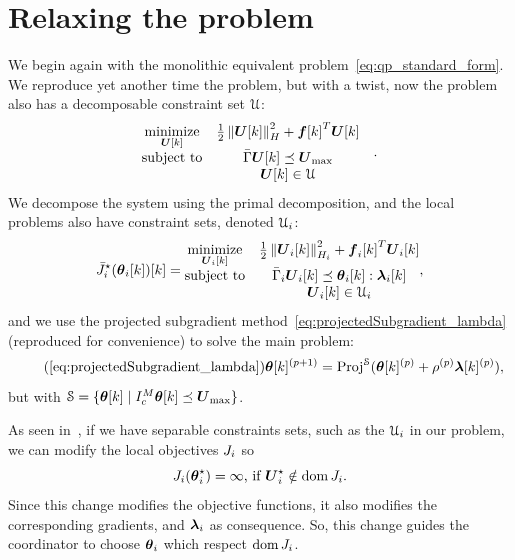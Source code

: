 \documentclass[../main.tex]{subfiles}
\begin{document}
\section{Relaxing the problem}\label{sec:not-so-deprived}
We begin again with the monolithic \mpc{} equivalent problem~\eqref{eq:qp_standard_form}.
We reproduce yet another time the problem, but with a twist, now the problem also has a decomposable constraint set $\mathcal{U}$:
\begin{equation}
  \label{eq:qp_standard_form_again_set_constraint}
  \begin{aligned}
    \begin{matrix}
      \mathop{\textrm{minimize}}\limits_{\boldsymbol{U}[k]} &
                                      \frac{1}{2}\left\lVert\boldsymbol{U}[k]\right\rVert^{2}_{H} + {\boldsymbol{f}[k]}^{T}\boldsymbol{U}[k] &\\
      \mathrm{subject~ to} & \bar{\Gamma}\boldsymbol{U}[k]\preceq {\boldsymbol{U}}_{\text{max}} \\
                                    & \boldsymbol{U}[k]\in \mathcal{U}
    \end{matrix}
  \end{aligned}.
\end{equation}
We decompose the system using the primal decomposition, and the local problems also have constraint sets, denoted $\mathcal{U}_{i}$:
\begin{equation}
  \label{eq:DOP_local_set_constraint}
  \eqoptobji(\thetaik)[k]=
  \begin{matrix}
    \minimize\limits_{\vec{U}_{i}[k]}&\frac{1}{2}\norm{\vec{U}_{i}[k]}^{2}_{H_{i}} + {\vec{f}_{i}[k]}^{T}\vec{U}_{i}[k]\\
    \mathrm{subject~ to} & \bar{\Gamma}_{i}\vec{U}_{i}[k] \preceq \thetaik:\lambdaik\\
                                     & \vec{U}_{i}[k]\in \set{U}_{i}
  \end{matrix},
\end{equation}
and we use the projected subgradient method~\eqref{eq:projectedSubgradient_lambda} (reproduced for convenience) to solve the main problem:
\begin{equation}
  \label{eq:projectedSubgradient_lambda_reprise}
  \tag{\ref*{eq:projectedSubgradient_lambda}}
  \vec{\theta}[k]\pplusone=\Proj^{\set{S}}(\vec{\theta}[k]\p+\rho\p\vec{\lambda}[k]\p),
\end{equation}
but with ${\mathcal{S} = \{\boldsymbol{\theta}[k]\mid I_{c}^{M}\boldsymbol{\theta}[k]\preceq \boldsymbol{U}_{\max}\}}$.
\begin{remark}
  As seen in~\cite{BoydEtAl2015}, if we have separable constraints sets, such as the $\mathcal{U}_{i}$ in our problem, we can modify the local objectives $J_{i}$ so \begin{equation*}
    J_{i}(\boldsymbol{\theta}_i^{\star})=\infty\text{, if }\boldsymbol{U}_{i}^{\star}\notin\operatorname{dom}{J_{i}}.
  \end{equation*}
  Since this change modifies the objective functions, it also modifies the corresponding gradients, and $\boldsymbol{\lambda}_{i}$ as consequence.
  So, this change guides the coordinator to choose $\boldsymbol{\theta}_{i}$ which respect $\operatorname{dom}{J_{i}}$.
\end{remark}
\end{document}
